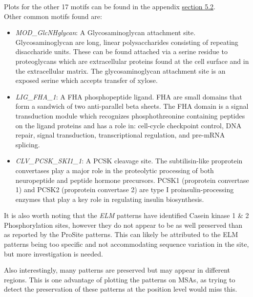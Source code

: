 \documentclass[10pt,twocolumn,letterpaper]{article}
\begin{document}
Plots for the other 17 motifs can be found in the appendix \hyperref[sec:elm_motifs]{section 5.2}. \\

Other common motifs found are:

\begin{itemize}
\item \textit{MOD\_GlcNHglycan}: A Glycosaminoglycan attachment site. 
Glycosaminoglycan are long, linear polysaccharides consisting of repeating disaccharide units. These can be found attached  via a serine residue to proteoglycans which are extracellular proteins found at the cell surface and in the extracellular matrix. The glycosaminoglycan attachment site is an exposed serine which accepts transfer of xylose. \cite{MODGlcNHglycan}
\item \textit{LIG\_FHA\_1}: A FHA phosphopeptide ligand. FHA are small domains that form a sandwich of two anti-parallel beta sheets. The FHA domain is a signal transduction module which recognizes phosphothreonine containing peptides on the ligand proteins and has a role in: cell-cycle checkpoint control, DNA repair, signal transduction, transcriptional regulation, and pre-mRNA splicing.\cite{LIGFHA1}

\item \textit{CLV\_PCSK\_SKI1\_1}: A PCSK cleavage site. 
The subtilisin-like proprotein convertases play a major role in the proteolytic processing of both neuropeptide and peptide hormone precursors.
PCSK1 (proprotein convertase 1) and PCSK2 (proprotein convertase 2) are type I proinsulin-processing enzymes that play a key role in regulating insulin biosynthesis.\cite{CLVPCSKSKI11}

\end{itemize}


It is also worth noting that the \textit{ELM} patterns have identified Casein kinase 1 \& 2 Phosphorylation sites, however they do not appear to be as well preserved than as reported by the ProSite patterns. This can likely be attributed to the ELM patterns being too specific and not accommodating sequence variation in the site, but more investigation is needed.

Also interestingly, many patterns are preserved but may appear in different regions. This is one advantage of plotting the patterns on MSAs, as trying to detect the preservation of these patterns at the position level would miss this.

\end{document}
